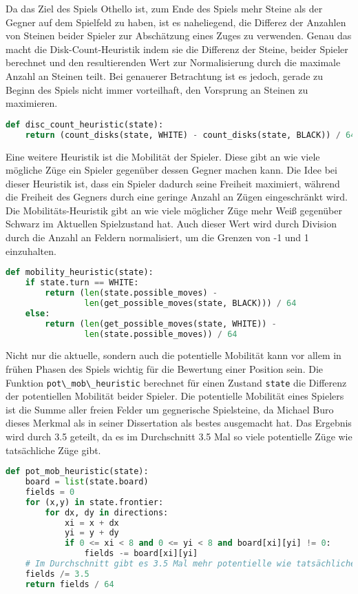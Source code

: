 Da das Ziel des Spiels Othello ist, zum Ende des Spiels mehr Steine als
der Gegner auf dem Spielfeld zu haben, ist es naheliegend, die Differez
der Anzahlen von Steinen beider Spieler zur Abschätzung eines Zuges zu
verwenden. Genau das macht die Disk-Count-Heuristik indem sie die
Differenz der Steine, beider Spieler berechnet und den resultierenden
Wert zur Normalisierung durch die maximale Anzahl an Steinen teilt. Bei
genauerer Betrachtung ist es jedoch, gerade zu Beginn des Spiels nicht
immer vorteilhaft, den Vorsprung an Steinen zu maximieren.

\begin{lstlisting}[language=Python]
def disc_count_heuristic(state):
    return (count_disks(state, WHITE) - count_disks(state, BLACK)) / 64
\end{lstlisting}

Eine weitere Heuristik ist die Mobilität der Spieler. Diese gibt an wie
viele mögliche Züge ein Spieler gegenüber dessen Gegner machen kann. Die
Idee bei dieser Heuristik ist, dass ein Spieler dadurch seine Freiheit
maximiert, während die Freiheit des Gegners durch eine geringe Anzahl an
Zügen eingeschränkt wird. Die Mobilitäts-Heuristik gibt an wie viele
möglicher Züge mehr Weiß gegenüber Schwarz im Aktuellen Spielzustand
hat. Auch dieser Wert wird durch Division durch die Anzahl an Feldern
normalisiert, um die Grenzen von -1 und 1 einzuhalten.

\begin{lstlisting}[language=Python]
def mobility_heuristic(state):
    if state.turn == WHITE:
        return (len(state.possible_moves) -
                len(get_possible_moves(state, BLACK))) / 64
    else:
        return (len(get_possible_moves(state, WHITE)) -
                len(state.possible_moves)) / 64
\end{lstlisting}

Nicht nur die aktuelle, sondern auch die potentielle Mobilität kann vor
allem in frühen Phasen des Spiels wichtig für die Bewertung einer
Position sein. Die Funktion
\passthrough{\lstinline!pot\_mob\_heuristic!} berechnet für einen
Zustand \passthrough{\lstinline!state!} die Differenz der potentiellen
Mobilität beider Spieler. Die potentielle Mobilität eines Spielers ist
die Summe aller freien Felder um gegnerische Spielsteine, da Michael
Buro dieses Merkmal als in seiner Dissertation als bestes ausgemacht
hat. Das Ergebnis wird durch 3.5 geteilt, da es im Durchschnitt 3.5 Mal
so viele potentielle Züge wie tatsächliche Züge gibt.

\begin{lstlisting}[language=Python]
def pot_mob_heuristic(state):
    board = list(state.board)
    fields = 0
    for (x,y) in state.frontier:
        for dx, dy in directions:
            xi = x + dx
            yi = y + dy
            if 0 <= xi < 8 and 0 <= yi < 8 and board[xi][yi] != 0:
                fields -= board[xi][yi]
    # Im Durchschnitt gibt es 3.5 Mal mehr potentielle wie tatsächliche Züge
    fields /= 3.5 
    return fields / 64
\end{lstlisting}

